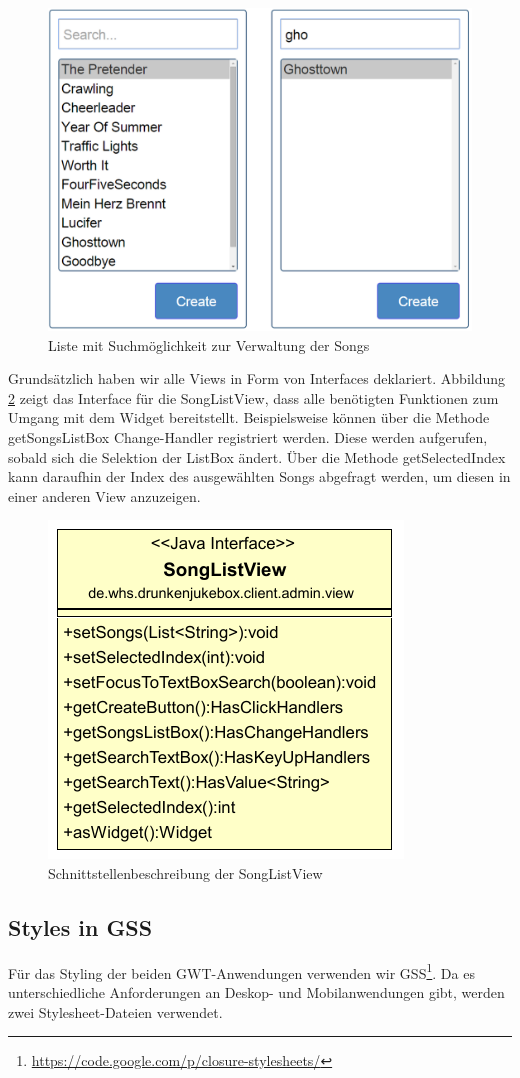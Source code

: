 \begin{figure}[H]
\centering
\includegraphics[width=0.7\linewidth]{Bilder/SongListView}
\caption{Liste mit Suchmöglichkeit zur Verwaltung der Songs}
\label{fig:SongListView}
\end{figure}

Grundsätzlich haben wir alle Views in Form von Interfaces deklariert. Abbildung \ref{fig:SongListViewClass} zeigt das Interface für die SongListView, dass alle benötigten Funktionen zum Umgang mit dem Widget bereitstellt. Beispielsweise können über die Methode getSongsListBox Change-Handler registriert werden. Diese werden aufgerufen, sobald sich die Selektion der ListBox ändert. Über die Methode getSelectedIndex kann daraufhin der Index des ausgewählten Songs abgefragt werden, um diesen in einer anderen View anzuzeigen.

\begin{figure}[H]
\centering
\includegraphics[width=0.4\linewidth]{Bilder/SongListViewClass}
\caption{Schnittstellenbeschreibung der SongListView}
\label{fig:SongListViewClass}
\end{figure}


\subsection{Styles in GSS}
Für das Styling der beiden GWT-Anwendungen verwenden wir GSS\footnote{\url{https://code.google.com/p/closure-stylesheets/}}. Da es unterschiedliche Anforderungen
an Deskop- und Mobilanwendungen gibt, werden zwei Stylesheet-Dateien verwendet.

